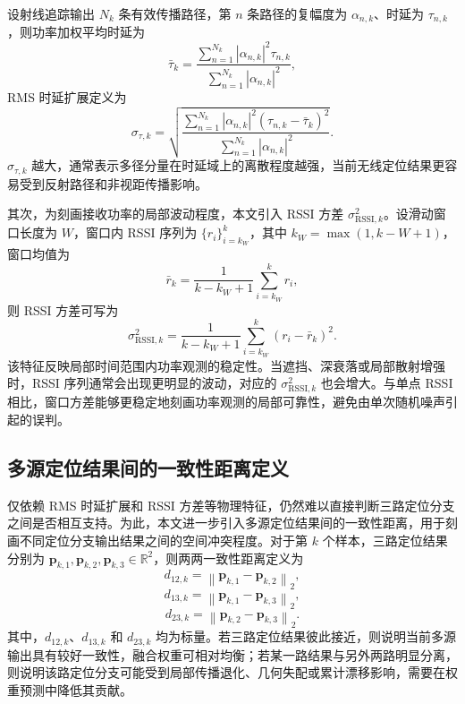 设射线追踪输出 \(N_k\) 条有效传播路径，第 \(n\) 条路径的复幅度为 \(\alpha_{n,k}\)、时延为 \(\tau_{n,k}\)，则功率加权平均时延为
\begin{equation}
\bar{\tau}_k
=
\frac{\sum_{n=1}^{N_k}|\alpha_{n,k}|^2\tau_{n,k}}
{\sum_{n=1}^{N_k}|\alpha_{n,k}|^2},
\label{eq:3_7_mean_delay}
\end{equation}
RMS 时延扩展定义为
\begin{equation}
\sigma_{\tau,k}
=
\sqrt{
\frac{\sum_{n=1}^{N_k} |\alpha_{n,k}|^2(\tau_{n,k}-\bar{\tau}_k)^2}
{\sum_{n=1}^{N_k} |\alpha_{n,k}|^2}
}.
\label{eq:3_8_rms_delay}
\end{equation}
\(\sigma_{\tau,k}\) 越大，通常表示多径分量在时延域上的离散程度越强，当前无线定位结果更容易受到反射路径和非视距传播影响。

其次，为刻画接收功率的局部波动程度，本文引入 RSSI 方差 \(\sigma^2_{\mathrm{RSSI},k}\)。设滑动窗口长度为 \(W\)，窗口内 RSSI 序列为 \(\{r_i\}_{i=k_W}^{k}\)，其中 \(k_W=\max(1,k-W+1)\)，窗口均值为
\begin{equation}
\bar{r}_k
=
\frac{1}{k-k_W+1}
\sum_{i=k_W}^{k}r_i,
\label{eq:3_9_rssi_mean}
\end{equation}
则 RSSI 方差可写为
\begin{equation}
\sigma^2_{\mathrm{RSSI},k}
=
\frac{1}{k-k_W+1}
\sum_{i=k_W}^{k}
\left(
r_i-\bar{r}_k
\right)^2.
\label{eq:3_10_rssi_var}
\end{equation}
该特征反映局部时间范围内功率观测的稳定性。当遮挡、深衰落或局部散射增强时，RSSI 序列通常会出现更明显的波动，对应的 \(\sigma^2_{\mathrm{RSSI},k}\) 也会增大。与单点 RSSI 相比，窗口方差能够更稳定地刻画功率观测的局部可靠性，避免由单次随机噪声引起的误判。

\subsection{多源定位结果间的一致性距离定义}
\label{subsec:3_3_2}

仅依赖 RMS 时延扩展和 RSSI 方差等物理特征，仍然难以直接判断三路定位分支之间是否相互支持。为此，本文进一步引入多源定位结果间的一致性距离，用于刻画不同定位分支输出结果之间的空间冲突程度。对于第 \(k\) 个样本，三路定位结果分别为 \(\mathbf{p}_{k,1},\mathbf{p}_{k,2},\mathbf{p}_{k,3}\in\mathbb{R}^{2}\)，则两两一致性距离定义为
\begin{equation}
d_{12,k}
=
\left\|
\mathbf{p}_{k,1}-\mathbf{p}_{k,2}
\right\|_2,
\label{eq:3_10_consistency_12}
\end{equation}
\begin{equation}
d_{13,k}
=
\left\|
\mathbf{p}_{k,1}-\mathbf{p}_{k,3}
\right\|_2,
\label{eq:3_11_consistency_13}
\end{equation}
\begin{equation}
d_{23,k}
=
\left\|
\mathbf{p}_{k,2}-\mathbf{p}_{k,3}
\right\|_2.
\label{eq:3_12_consistency_23}
\end{equation}
其中，\(d_{12,k}\)、\(d_{13,k}\) 和 \(d_{23,k}\) 均为标量。若三路定位结果彼此接近，则说明当前多源输出具有较好一致性，融合权重可相对均衡；若某一路结果与另外两路明显分离，则说明该路定位分支可能受到局部传播退化、几何失配或累计漂移影响，需要在权重预测中降低其贡献。

